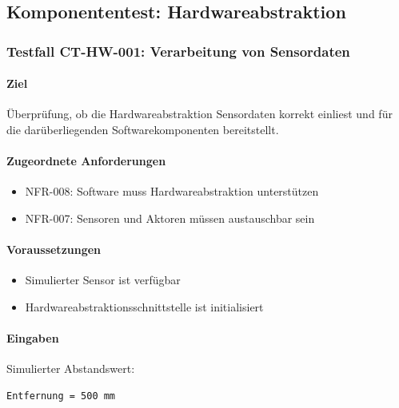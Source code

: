 \documentclass[
  a4paper,
  12pt,
  DIV=12,        %
  parskip=half,  %
  headings=small %
]{scrartcl}
\theoremstyle{definition}
\providecommand{\tightlist}{%
  \setlength{\itemsep}{0pt}\setlength{\parskip}{0pt}}
\theoremstyle{definition}
\begin{document}
\subsection{Komponententest:
Hardwareabstraktion}\label{komponententest-hardwareabstraktion}

\subsubsection{Testfall CT-HW-001: Verarbeitung von
Sensordaten}\label{testfall-ct-hw-001-verarbeitung-von-sensordaten}

\paragraph{Ziel}\label{ziel}

Überprüfung, ob die Hardwareabstraktion Sensordaten korrekt einliest und
für die darüberliegenden Softwarekomponenten bereitstellt.

\paragraph{Zugeordnete Anforderungen}\label{zugeordnete-anforderungen}

\begin{itemize}
\tightlist
\item
  NFR-008: Software muss Hardwareabstraktion unterstützen
\item
  NFR-007: Sensoren und Aktoren müssen austauschbar sein
\end{itemize}

\paragraph{Voraussetzungen}\label{voraussetzungen}

\begin{itemize}
\tightlist
\item
  Simulierter Sensor ist verfügbar
\item
  Hardwareabstraktionsschnittstelle ist initialisiert
\end{itemize}

\paragraph{Eingaben}\label{eingaben}

Simulierter Abstandswert:

\begin{verbatim}
Entfernung = 500 mm
\end{verbatim}
\end{document}
